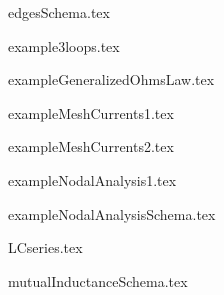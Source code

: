 \begin{frame}{edgesSchema.tex}
\begin{center}

\end{center}
\end{frame}

\begin{frame}{example3loops.tex}
\begin{center}

\end{center}
\end{frame}

\begin{frame}{exampleGeneralizedOhmsLaw.tex}
\begin{center}

\end{center}
\end{frame}

\begin{frame}{exampleMeshCurrents1.tex}
\begin{center}

\end{center}
\end{frame}

\begin{frame}{exampleMeshCurrents2.tex}
\begin{center}

\end{center}
\end{frame}

\begin{frame}{exampleNodalAnalysis1.tex}
\begin{center}

\end{center}
\end{frame}

\begin{frame}{exampleNodalAnalysisSchema.tex}
\begin{center}

\end{center}
\end{frame}

\begin{frame}{LCseries.tex}
\begin{center}

\end{center}
\end{frame}

\begin{frame}{mutualInductanceSchema.tex}
\begin{center}

\end{center}
\end{frame}


